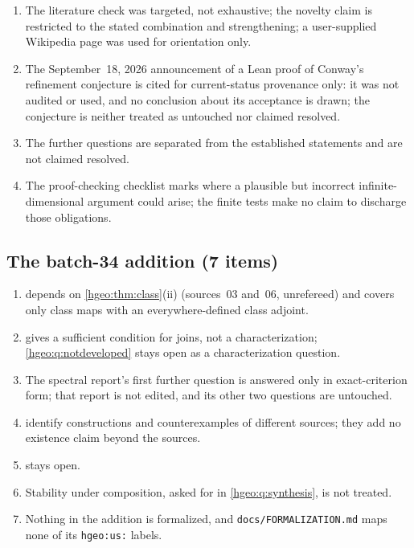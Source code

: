 \documentclass[11pt,letterpaper]{article}
\numberwithin{equation}{section}
\theoremstyle{definition}
\theoremstyle{remark}
\newcommand{\replabel}[1]{\nolinkurl{#1}}
\newcommand{\fn}[1]{\nolinkurl{#1}}
\begin{document}
\begin{enumerate}[leftmargin=*,widest=00,label=07.\arabic*]
not assertions that the claims of those reports were checked.
\item The literature check was targeted, not exhaustive; the novelty claim is
restricted to the stated combination and strengthening; a user-supplied
Wikipedia page was used for orientation only.
\item The September~18, 2026 announcement of a Lean proof of Conway's
refinement conjecture is cited for current-status provenance only: it was not
audited or used, and no conclusion about its acceptance is drawn; the
conjecture is neither treated as untouched nor claimed resolved.
\item The further questions are separated from the established statements
and are not claimed resolved.
\item The proof-checking checklist marks where a plausible but incorrect
infinite-dimensional argument could arise; the finite tests make no claim to
discharge those obligations.
\end{enumerate}

\subsection{The batch-34 addition (7 items)}
\begin{enumerate}[leftmargin=*,widest=00,label=A.\arabic*]
\item {} depends on \cref{hgeo:thm:class}(ii)
(sources~03 and~06, unrefereed) and covers only class maps with an
everywhere-defined class adjoint.
\item {} gives a sufficient condition for joins, not a
characterization; \cref{hgeo:q:notdeveloped} stays open as a
characterization question.
\item The spectral report's first further question is answered only in
exact-criterion form; that report is not edited, and its other two questions
are untouched.
\item {} identify constructions
and counterexamples of different sources; they add no existence claim beyond
the sources.
\item {} stays open.
\item Stability under composition, asked for in \cref{hgeo:q:synthesis}, is not
treated.
\item Nothing in the addition is formalized, and \fn{docs/FORMALIZATION.md}
maps none of its \replabel{hgeo:us:} labels.
\end{enumerate}
\end{document}
